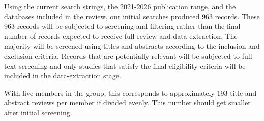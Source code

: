 \documentclass[sigconf]{acmart}
\begin{document}
Using the current search strings, the 2021-2026 publication range, and the databases included in the review, our initial searches produced 963 records. These 963 records will be subjected to screening and filtering rather than the final number of records expected to receive full review and data extraction. The majority will be screened using titles and abstracts according to the inclusion and exclusion criteria. Records that are potentially relevant will be subjected to full-text screening and only studies that satisfy the final eligibility criteria will be included in the data-extraction stage.

With five members in the group, this corresponds to approximately 193 title and abstract reviews per member if divided evenly. This number should get smaller after initial screening. 

 
\end{document}
